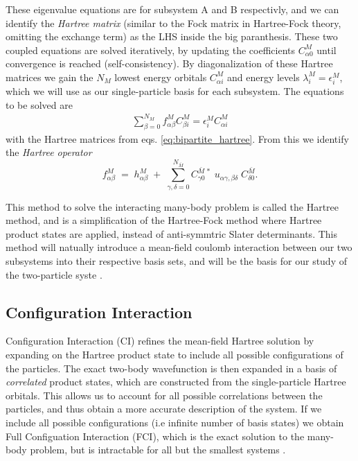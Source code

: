 \documentclass{subfiles}
\begin{document}
These eigenvalue equations are for subsystem A and B respectivly, and we can identify the \emph{Hartree matrix} (similar to the Fock matrix in Hartree-Fock theory, omitting the exchange term) as the LHS inside the big paranthesis. These two coupled equations are solved iteratively, by updating the coefficients $C_{\alpha 0}^M$ until convergence is reached (self-consistency). By diagonalization of these Hartree matrices we gain the $N_M$ lowest energy orbitals $C^M_{\alpha i}$ and energy levels $\lambda^M_i=\epsilon^M_i$\cite{leinonen2024coulomb}, which we will use as our single-particle basis for each subsystem. The equations to be solved are
\begin{align}
    \sum_{\beta=0}^{N_M} f_{\alpha\beta}^M C^M_{\beta i} = \epsilon_i^M C^M_{\alpha i}\label{eq:hartree_eigenvalue}
\end{align}
with the Hartree matrices from eqs. \ref{eq:bipartite_hartree}. From this we identify the \emph{Hartree operator}
\begin{equation}
    f_{\alpha\beta}^M \;=\; h_{\alpha\beta}^M
    \;+\;\sum_{\gamma,\delta=0}^{N_{\bar M}}
      C_{\gamma0}^{\bar M\,*}\;u_{\alpha\gamma,\beta\delta}\;C_{\delta0}^{\bar M}.
\label{eq:hartree_operator}
\end{equation}

This method to solve the interacting many-body problem is called the Hartree method, and is a simplification of the Hartree-Fock method where Hartree product states are applied, instead of anti-symmtric Slater determinants. This method will natually introduce a mean-field coulomb interaction between our two subsystems into their respective basis sets, and will be the basis for our study of the two-particle syste \cite{leinonen2024coulomb}.
\subsection{Configuration Interaction}\label{sec:CI}
Configuration Interaction (CI) refines the mean-field Hartree solution by expanding on the Hartree product state to include all possible configurations of the particles. The exact two-body wavefunction is then expanded in a basis of \emph{correlated} product states, which are constructed from the single-particle Hartree orbitals. This allows us to account for all possible correlations between the particles, and thus obtain a more accurate description of the system. If we include all possible configurations (i.e infinite number of basis states) we obtain Full Configuation Interaction (FCI), which is the exact solution to the many-body problem, but is intractable for all but the smallest systems \cite{helgaker2013molecular, szabo1996modern}. \\
\end{document}
